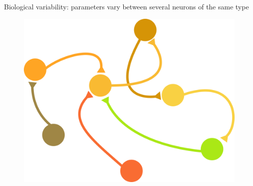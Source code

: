 \documentclass[presentation]{beamer}
\begin{document}

\begin{frame}{Biological variability: parameters vary between several neurons of the same type}
  \begin{figure}
    \includegraphics[height=0.7\textheight]{network.png}
  \end{figure}

\end{frame}




\end{document}
